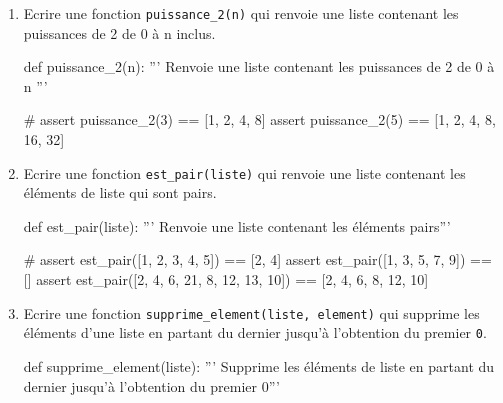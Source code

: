 \begin{exercice_cours}{}

	\begin{enumerate}
		\item Ecrire une fonction \texttt{puissance\_2(n)} qui renvoie une liste contenant les puissances de 2 de 0 à n inclus.
		\begin{CodePythontexAlt}[Largeur=1\linewidth,Centre,PremLigne=1, Lignes=false]{}
				def puissance_2(n):
					''' Renvoie une liste contenant les puissances de 2 de 0 à n '''










					#
				assert puissance_2(3) == [1, 2, 4, 8]
				assert puissance_2(5) == [1, 2, 4, 8, 16, 32]
				\end{CodePythontexAlt}

		\item Ecrire une fonction \texttt{est\_pair(liste)} qui renvoie une liste contenant les éléments de liste qui sont pairs.
		\begin{CodePythontexAlt}[Largeur=1\linewidth,Centre,PremLigne=1, Lignes=false]{}
				def est_pair(liste):
					''' Renvoie une liste contenant les éléments pairs'''










					#
				assert est_pair([1, 2, 3, 4, 5]) == [2, 4]
				assert est_pair([1, 3, 5, 7, 9]) == []
				assert est_pair([2, 4, 6, 21, 8, 12, 13, 10]) == [2, 4, 6, 8, 12, 10]
				\end{CodePythontexAlt}

				\pagebreak

		\item Ecrire une fonction \texttt{supprime\_element(liste, element)} qui supprime les éléments d'une liste en partant du dernier jusqu'à l'obtention du premier \verb|0|.
		
		\begin{CodePythontexAlt}[Largeur=1\linewidth,Centre,PremLigne=1, Lignes=false]{}
				def supprime_element(liste):
					''' Supprime les éléments de liste en partant du dernier 
					jusqu'à l'obtention du premier 0'''










\end{CodePythontexAlt}
\end{enumerate}
\end{exercice_cours}
